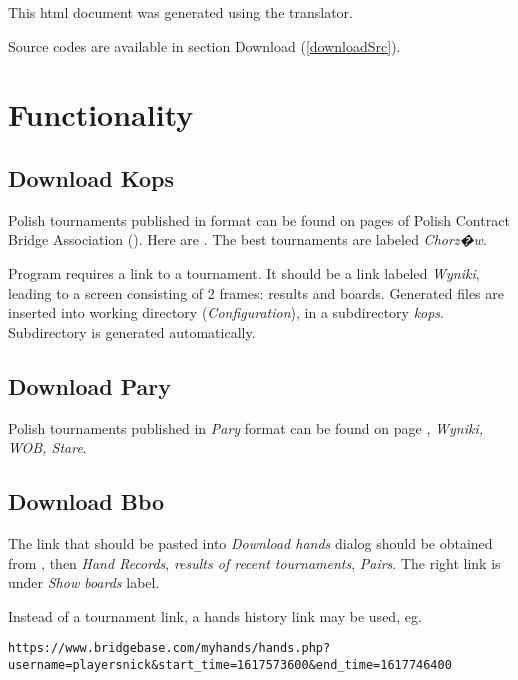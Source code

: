 \documentclass[polish,a4paper,11pt,oneside]{article}
\begin{document}
This html document was generated using the
 translator.

Source codes are available in section Download (\ref{downloadSrc}).

\section{Functionality}
\subsection{Download Kops} \label{pobKops}

Polish tournaments published in 
format can be found on pages of Polish Contract Bridge Association
().
Here are .
The best tournaments are labeled {\em Chorz�w}.

Program requires a link to a tournament.
It should be a link labeled {\em Wyniki},
leading to a screen consisting of 2 frames: results and boards.
Generated files are inserted into working directory ({\em Configuration}),
in a subdirectory {\em kops}. Subdirectory is generated automatically.

\subsection{Download Pary} \label{pobPary}

Polish tournaments published in {\em Pary}
format can be found on page
,
{\em Wyniki, WOB, Stare}.

\subsection{Download Bbo} \label{pobBbo}
The link that should be pasted into {\em Download hands} dialog
should be obtained from \bbolonglink, then {\em Hand Records}, 
{\em results of recent tournaments}, {\em Pairs}.
The right link is under {\em Show boards} label.

Instead of a tournament link, a hands history link may be used, eg.
\begin{verbatim}
https://www.bridgebase.com/myhands/hands.php?username=playersnick&start_time=1617573600&end_time=1617746400
\end{verbatim}
\end{document}
